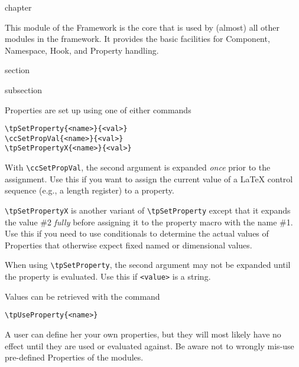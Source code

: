 \begin{Heading}[label=chap:common]{chapter}
\end{Heading}

This module of the {\CoCoTeX} Framework is the core
that is used by (almost) all other modules in the framework. It
provides the basic facilities for Component, Namespace, Hook, and
Property handling.

\begin{Heading}[label=sec:use_props]{section}
\end{Heading}

\begin{Heading}[label=sec:set_props]{subsection}
\end{Heading}

Properties are set up using one of either commands
\begin{lstlisting}[style=tex]
\tpSetProperty{<name>}{<val>}
\ccSetPropVal{<name>}{<val>}
\tpSetPropertyX{<name>}{<val>}
\end{lstlisting}
With
\lstinline{\ccSetPropVal}, the second argument is expanded \textit{once}
prior to the assignment. Use this if you want to assign the current
value of a {\LaTeX} control sequence (e.g., a length register) to a
property.

\lstinline{\tpSetPropertyX} is another variant of \lstinline{\tpSetProperty}
except that it expands the value \#2 \textit{fully} before assigning
it to the property macro with the name \#1.  Use this if you need to
use conditionals to determine the actual values of Properties that
otherwise expect fixed named or dimensional values.


When using \lstinline{\tpSetProperty}, the second argument may not be
expanded until the property is evaluated. Use this if
\lstinline{<value>} is a string.

Values can be retrieved with the command
\begin{lstlisting}[style=tex]
\tpUseProperty{<name>}
\end{lstlisting}

A user can define her your own properties, but they will most likely
have no effect until they are used or evaluated against. Be aware not
to wrongly mis-use pre-defined Properties of the {\CoCoTeX}
modules.

